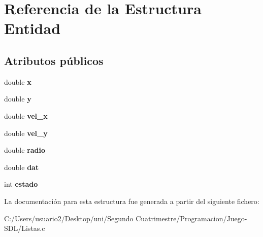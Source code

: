 \hypertarget{struct_entidad}{}\section{Referencia de la Estructura Entidad}
\label{struct_entidad}
\subsection*{Atributos públicos}
\begin{DoxyCompactItemize}
\item 
double {\bfseries x}\hypertarget{struct_entidad_a9c2276d478cdaa686e13ea674ee39bbf}{}\label{struct_entidad_a9c2276d478cdaa686e13ea674ee39bbf}

\item 
double {\bfseries y}\hypertarget{struct_entidad_aa0fc15ed766abcc8564049e999f57cf1}{}\label{struct_entidad_aa0fc15ed766abcc8564049e999f57cf1}

\item 
double {\bfseries vel\+\_\+x}\hypertarget{struct_entidad_af1090c062eb00a43813ac9920bbfd877}{}\label{struct_entidad_af1090c062eb00a43813ac9920bbfd877}

\item 
double {\bfseries vel\+\_\+y}\hypertarget{struct_entidad_a071935b99734fb6455413872f423e1ed}{}\label{struct_entidad_a071935b99734fb6455413872f423e1ed}

\item 
double {\bfseries radio}\hypertarget{struct_entidad_a1440ee2033a1263c7a1e74f4aa481fec}{}\label{struct_entidad_a1440ee2033a1263c7a1e74f4aa481fec}

\item 
double {\bfseries dat}\hypertarget{struct_entidad_ad91fa469d8f0633148700ad3835294a4}{}\label{struct_entidad_ad91fa469d8f0633148700ad3835294a4}

\item 
int {\bfseries estado}\hypertarget{struct_entidad_a322cf44494366259f64f43e03404ccf4}{}\label{struct_entidad_a322cf44494366259f64f43e03404ccf4}

\end{DoxyCompactItemize}


La documentación para esta estructura fue generada a partir del siguiente fichero\+:\begin{DoxyCompactItemize}
\item 
C\+:/\+Users/usuario2/\+Desktop/uni/\+Segundo Cuatrimestre/\+Programacion/\+Juego-\/\+S\+D\+L/Listas.\+c\end{DoxyCompactItemize}

